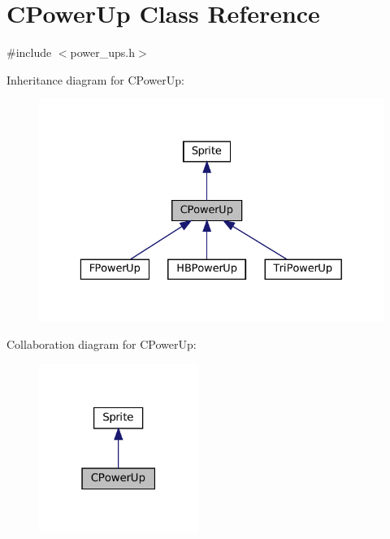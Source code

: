 \hypertarget{classCPowerUp}{}\section{C\+Power\+Up Class Reference}
\label{classCPowerUp}


{\ttfamily \#include $<$power\+\_\+ups.\+h$>$}



Inheritance diagram for C\+Power\+Up\+:
\nopagebreak
\begin{figure}[H]
\begin{center}
\leavevmode
\includegraphics[width=329pt]{classCPowerUp__inherit__graph}
\end{center}
\end{figure}


Collaboration diagram for C\+Power\+Up\+:
\nopagebreak
\begin{figure}[H]
\begin{center}
\leavevmode
\includegraphics[width=147pt]{classCPowerUp__coll__graph}
\end{center}
\end{figure}
